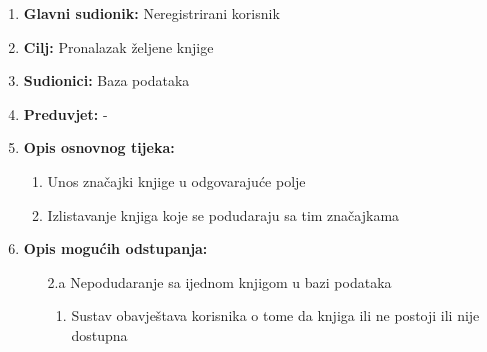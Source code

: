 \noindent {}
\begin{enumerate}
	
	\item \textbf{Glavni sudionik: } Neregistrirani korisnik
	\item  \textbf{Cilj:} Pronalazak željene knjige
	\item  \textbf{Sudionici:} Baza podataka
	\item  \textbf{Preduvjet:} -
	\item  \textbf{Opis osnovnog tijeka:}
	
	\begin{enumerate}
		
		\item Unos značajki knjige u odgovarajuće polje
		\item Izlistavanje knjiga koje se podudaraju sa tim značajkama
		
	\end{enumerate}
	
	\item  \textbf{Opis mogućih odstupanja:}
	
	\item[] \begin{enumerate}
		
		\item[2.a] Nepodudaranje sa ijednom knjigom u bazi podataka
		\item[] \begin{enumerate}
			
			\item Sustav obavještava korisnika o tome da knjiga ili ne postoji ili nije dostupna
			
		\end{enumerate}
		
	\end{enumerate}
	
\end{enumerate}

